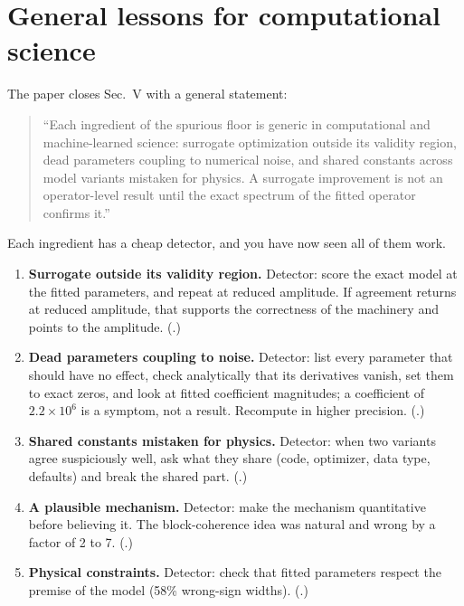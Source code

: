 \section{General lessons for computational science}\label{sec:paper-spurious-floor-lessons}

The paper closes Sec.~V with a general statement:

\begin{quote}
``Each ingredient of the spurious floor is generic in computational and machine-learned science: surrogate optimization outside its validity region, dead parameters coupling to numerical noise, and shared constants across model variants mistaken for physics. A surrogate improvement is not an operator-level result until the exact spectrum of the fitted operator confirms it.''
\end{quote}

Each ingredient has a cheap detector, and you have now seen all of them work.

\begin{enumerate}
\item \textbf{Surrogate outside its validity region.} Detector: score the exact model at the fitted parameters, and repeat at reduced amplitude. If agreement returns at reduced amplitude, that supports the correctness of the machinery and points to the amplitude. (.)
\item \textbf{Dead parameters coupling to noise.} Detector: list every parameter that should have no effect, check analytically that its derivatives vanish, set them to exact zeros, and look at fitted coefficient magnitudes; a coefficient of $2.2\times10^6$ is a symptom, not a result. Recompute in higher precision. (.)
\item \textbf{Shared constants mistaken for physics.} Detector: when two variants agree suspiciously well, ask what they share (code, optimizer, data type, defaults) and break the shared part. (.)
\item \textbf{A plausible mechanism.} Detector: make the mechanism quantitative before believing it. The block-coherence idea was natural and wrong by a factor of 2 to 7. (.)
\item \textbf{Physical constraints.} Detector: check that fitted parameters respect the premise of the model (58\% wrong-sign widths). (.)
\end{enumerate}

